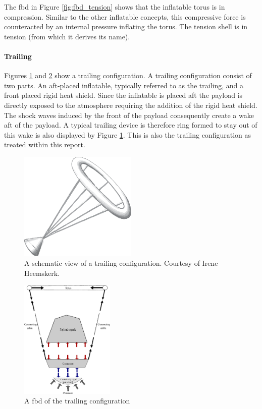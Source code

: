 The \gls{fbd} in Figure  \ref{fig:fbd_tension} shows that the inflatable torus is in compression. Similar to the other inflatable concepts, this compressive force is counteracted by an internal pressure inflating the torus. The tension shell is in tension (from which it derives its name). 

\paragraph{Trailing}

Figures \ref{fig:conc_trailing} and \ref{fig:fbd_trailing} show a trailing configuration. A trailing configuration consist of two parts. An aft-placed inflatable, typically referred to as the trailing, and a front placed rigid heat shield. Since the inflatable is placed aft the payload is directly exposed to the atmosphere requiring the addition of the rigid heat shield. The shock waves induced by the front of the payload consequently create a wake aft of the payload. A typical trailing device is therefore ring formed to stay out of this wake is also displayed by Figure  \ref{fig:conc_trailing}. This is also the trailing configuration as treated within this report.

\begin{figure}[H]
\centering
\includegraphics[width = 0.5\textwidth]{Figure/trailing_ballute.eps}
\caption{A schematic view of a trailing configuration. Courtesy of Irene Heemskerk.}
\label{fig:conc_trailing}
\end{figure}

\begin{figure}[H]
\centering
\includegraphics[width = 0.4\textwidth]{Figure/FBD_trailing.eps}
\caption{A \gls{fbd} of the trailing configuration}
\label{fig:fbd_trailing}
\end{figure}

